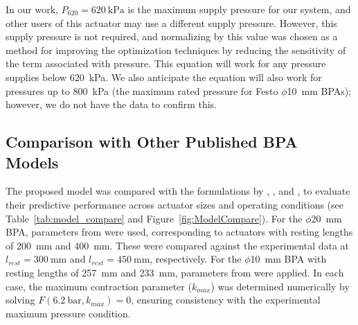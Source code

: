 \documentclass[actuators,article,accept,pdftex,moreauthors]{Definitions/mdpi}
\begin{document}
In our work, $P_{620}=\qty{620}{\kPa}$ is the maximum supply pressure for our system, and other users of this actuator may use a different supply pressure. However, this supply pressure is not required, and normalizing by this value was chosen as a method for improving the optimization techniques by reducing the sensitivity of the term associated with pressure. This equation will work for any pressure supplies below \qty{620}{\kPa}. We also anticipate the equation will also work for pressures up to \qty{800}{\kPa} (the maximum rated pressure for Festo $\phi$\qty{10}{\mm} BPAs); however, we do not have the data to confirm this.

\subsection{Comparison with Other Published BPA Models}

The proposed model was compared with the formulations by \citet{sarosi_new_2012}, \citet{sarosi_10mm}, and \citet{martens_modeling_2017}, to evaluate their predictive performance across actuator sizes and operating conditions (see Table~\ref{tab:model_compare} and Figure~\ref{fig:ModelCompare}).
For the $\phi$\qty{20}{\mm} BPA, parameters from \cite{sarosi_new_2012} were used, corresponding to actuators with resting lengths of \qty{200}{\mm} and \qty{400}{\mm}. These were compared against the experimental data at $l_{rest}=\qty{300}{\mm}$ and $l_{rest}=\qty{450}{\mm}$, respectively. For the $\phi$\qty{10}{\mm} BPA with resting lengths of \qty{257}{\mm} and \qty{233}{\mm}, parameters from \cite{sarosi_10mm} were applied. In each case, the maximum contraction parameter ($k_{max}$) was determined numerically by solving $F(\qty{6.2}{\bar}, k_{max}) = 0$, ensuring consistency with the experimental maximum pressure condition.
\end{document}
